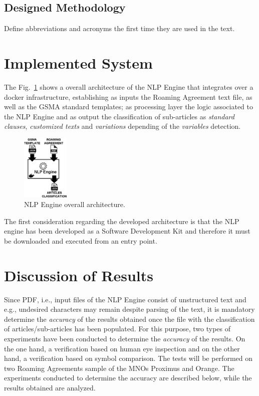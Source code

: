 \documentclass[conference]{style/IEEEtran}
\begin{document}
\subsection{Designed Methodology}
Define abbreviations and acronyms the first time they are used in the text.

\section{Implemented System}
The Fig.~\ref{fig1} shows a overall architecture of the NLP Engine that integrates over a docker infrastructure, establishing as inputs the Roaming Agreement text file, as well as the GSMA standard templates; as processing layer the logic associated to the NLP Engine and as output the classification of sub-articles as \textit{standard clauses}, \textit{customized texts} and \textit{variations} depending of the \textit{variables} detection.

\begin{figure}[htbp]
\centerline{\includegraphics[width=0.2\textwidth]{images/NLP_Engine.png}}
\caption{NLP Engine overall architecture.}
\label{fig1}
\end{figure}

The first consideration regarding the developed architecture is that the NLP engine has been developed as a Software Development Kit and therefore it must be downloaded and executed from an entry point. 

\section{Discussion of Results}
Since PDF, i.e., input files of the NLP Engine consist of unstructured text and e.g., undesired characters may remain despite parsing of the text, it is mandatory determine the \textit{accuracy} of the results obtained once the file with the classification of articles/sub-articles has been populated. For this purpose, two types of experiments have been conducted to determine the \textit{accuracy} of the results. On the one hand, a verification based on human eye inspection and on the other hand, a verification based on symbol comparison. The tests will be performed on two Roaming Agreements sample of the MNOs Proximus and Orange. The experiments conducted to determine the accuracy are described below, while the results obtained are analyzed.
\end{document}
